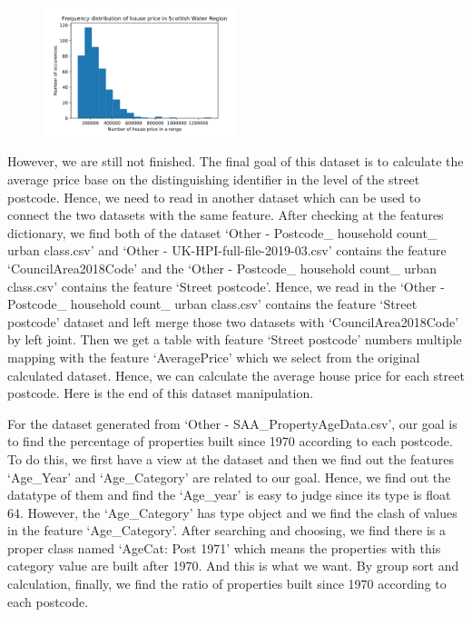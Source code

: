 \documentclass[11pt,twoside]{article}
\numberwithin{Theorem}{section}
\numberwithin{Definition}{section}
\numberwithin{Lemma}{section}
\numberwithin{Algorithm}{section}
\numberwithin{equation}{section}
\begin{document}
\begin{figure}[!ht]
    \centering
    \includegraphics[width=0.5\textwidth]{p8.png}
    \end{figure}

However, we are still not finished. The final goal of this dataset is to calculate the average price base on the distinguishing identifier in the level of the street postcode. Hence, we need to read in another dataset which can be used to connect the two datasets with the same feature. After checking at the features dictionary, we find both of the dataset ‘Other - Postcode\_ household count\_ urban class.csv’ and ‘Other - UK-HPI-full-file-2019-03.csv’ contains the feature ‘CouncilArea2018Code’ and the ‘Other - Postcode\_ household count\_ urban class.csv’ contains the feature ‘Street postcode’. Hence, we read in the ‘Other - Postcode\_ household count\_ urban class.csv’ contains the feature ‘Street postcode’ dataset and left merge those two datasets with ‘CouncilArea2018Code’ by left joint. Then we get a table with feature ‘Street postcode’ numbers multiple mapping with the feature ‘AveragePrice’ which we select from the original calculated dataset. Hence, we can calculate the average house price for each street postcode. Here is the end of this dataset manipulation. 

For the dataset generated from ‘Other - SAA\_PropertyAgeData.csv’, our goal is to find the percentage of properties built since 1970 according to each postcode. To do this, we first have a view at the dataset and then we find out the features ‘Age\_Year’ and ‘Age_Category’ are related to our goal. Hence, we find out the datatype of them and find the ‘Age_year’ is easy to judge since its type is float 64. However, the ‘Age\_Category’ has type object and we find the clash of values in the feature ‘Age\_Category’. After searching and choosing, we find there is a proper class named ‘AgeCat: Post 1971’ which means the properties with this category value are built after 1970. And this is what we want. By group sort and calculation, finally, we find the ratio of properties built since 1970 according to each postcode.
\end{document}
